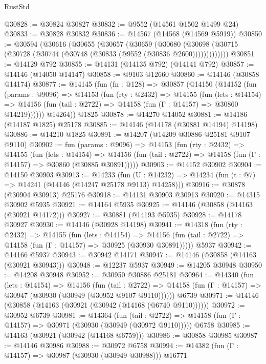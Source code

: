 \begin{lexlean}{RustStd}
\begin{coremodule}
@30828 := @30824 @30827
@30832 := @9552 (@14561 @1502 @1499 @24)
@30833 := @30828 @30832
@30836 := @14567 (@14568 (@14569 @5919))
@30850 := @30594
    (@30616
      (@30655
        (@30657
          (@30659
            (@30680
              (@30698 (@30715 (@30728 (@30744 (@30748 (@30833 (@9552 (@30836 @2600)))))))))))))
@30851 := @14129 @792
@30855 := @14131 (@14135 @792) (@14141 @792)
@30857 := @14146 (@14050 @14147)
@30858 := @9103 @12660
@30860 := @14146 (@30858 @14174)
@30877 := @14145
    (fun (fn : @128) =>
    @30857
      (@14150
        (@14152
          (fun (params : @9096) =>
          @14153
            (fun (rty : @2432) =>
            @14155
              (fun (lets : @14154) =>
              @14156 (fun (tail : @2722) => @14158 (fun (Γ : @14157) => @30860 @14219))))))
        @14264))
    @1825
@30878 := @14270 @14052
@30881 := @14186 (@14187 @1825) @25178
@30885 := @14146 (@14178 (@30881 @14194) @14198)
@30886 := @14210 @1825
@30891 := @14207 (@14209 @30886 @25181 @9107 @9110)
@30902 := fun (params : @9096) =>
  @14153
    (fun (rty : @2432) =>
    @14155
      (fun (lets : @14154) =>
      @14156 (fun (tail : @2722) => @14158 (fun (Γ : @14157) => @30860 (@30885 @30891)))))
@30903 := @14152 @30902
@30904 := @14150 @30903
@30913 := @14233
    (fun (U : @14232) => @14234 (fun (t : @7) => @14241 (@14146 (@14247 @25178 @9113) @14258)))
@30916 := @30878 (@30904 @30913) @25176
@30918 := @14131 @30903 @30913
@30920 := @14315 @30902 @5935
@30921 := @14164 @5935
@30925 := @14146 (@30858 (@14163 (@30921 @14172)))
@30927 := @30881 (@14193 @5935)
@30928 := @14178 @30927
@30930 := @14146 (@30928 @14198)
@30941 := @14318
    (fun (rty : @2432) =>
    @14155
      (fun (lets : @14154) =>
      @14156 (fun (tail : @2722) => @14158 (fun (Γ : @14157) => @30925 (@30930 @30891)))))
    @5937
@30942 := @14166 @5937
@30943 := @30942 @14171
@30947 := @14146 (@30858 (@14163 (@30921 @30943)))
@30948 := @12237 @5937
@30949 := @14205 @30948
@30950 := @14208 @30948
@30952 := @30950 @30886 @25181
@30964 := @14340
    (fun (lets : @14154) =>
    @14156
      (fun (tail : @2722) =>
      @14158 (fun (Γ : @14157) => @30947 (@30930 (@30949 (@30952 @9107 @9110))))))
    @6739
@30971 := @14146 (@30858 (@14163 (@30921 (@30942 (@14168 (@6740 @9110))))))
@30972 := @30952 @6739
@30981 := @14364
    (fun (tail : @2722) => @14158 (fun (Γ : @14157) => @30971 (@30930 (@30949 (@30972 @9110)))))
    @6758
@30985 := @14163 (@30921 (@30942 (@14168 @6759)))
@30986 := @30858 @30985
@30987 := @14146 @30986
@30988 := @30972 @6758
@30994 := @14382 (fun (Γ : @14157) => @30987 (@30930 (@30949 @30988))) @16771

\end{coremodule}
\end{lexlean}
